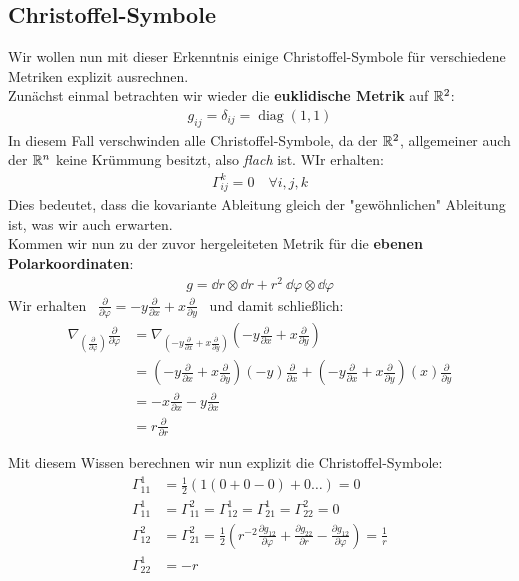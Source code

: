\subsection{Christoffel-Symbole}
Wir wollen nun mit dieser Erkenntnis einige Christoffel-Symbole für verschiedene Metriken explizit ausrechnen. \\
Zunächst einmal betrachten wir wieder die \textbf{euklidische Metrik} auf $\mathbb{R}^2$: 
\begin{align*}
g_{ij} = \delta_{ij} = \operatorname{diag}(1,1)
\end{align*}
In diesem Fall verschwinden alle Christoffel-Symbole, da der $\mathbb{R}^2$, allgemeiner auch der $\mathbb{R}^n$ keine Krümmung besitzt, also \textit{flach} ist. WIr erhalten:
\begin{align*}
\Gamma_{ij}^k = 0 \quad \forall i, j ,k
\end{align*}
Dies bedeutet, dass die kovariante Ableitung gleich der "gewöhnlichen"  Ableitung ist, was wir auch erwarten.\\
Kommen wir nun zu der zuvor hergeleiteten Metrik für die \textbf{ebenen Polarkoordinaten}:
\begin{align*}
g= \dd r \otimes \dd r + r^2 \ \dd\varphi \otimes \dd\varphi
\end{align*}
Wir erhalten \ $\frac{\partial}{\partial\varphi} = -y\frac{\partial}{\partial x} +x \frac{\partial}{\partial y}$ \ und damit schließlich:
\begin{align*}
\nabla_{(\frac{\partial}{\partial\varphi})}\frac{\partial}{\partial\varphi}&= \nabla_{(-y\frac{\partial}{\partial x} +x \frac{\partial}{\partial y})}(-y\frac{\partial}{\partial x} +x \frac{\partial}{\partial y}) \\
&=(-y\frac{\partial}{\partial x} +x \frac{\partial}{\partial y})(-y)\frac{\partial}{\partial x} + (-y\frac{\partial}{\partial x} +x \frac{\partial}{\partial y})(x)\frac{\partial}{\partial y} \\
&= -x\frac{\partial}{\partial x} -y\frac{\partial}{\partial x}\\
&= r\frac{\partial}{\partial r}
\end{align*}

Mit diesem Wissen berechnen wir nun explizit die Christoffel-Symbole:
\begin{align*}
\Gamma_{11}^1 &= \frac{1}{2}(1(0+0-0) + 0 \dots) = 0 \\
\Gamma_{11}^1 &= \Gamma_{11}^2 = \Gamma_{12}^1 = \Gamma_{21}^1 = \Gamma_{22}^2 = 0 \\
\Gamma_{12}^2 &= \Gamma_{21}^2 = \frac{1}{2}(r^{-2}\frac{\partial g_{12}}{\partial\varphi} + \frac{\partial g_{22}}{\partial r} - \frac{\partial g_{12}}{\partial\varphi}) = \frac{1}{r} \\
\Gamma_{22}^1 &= -r
\end{align*}

